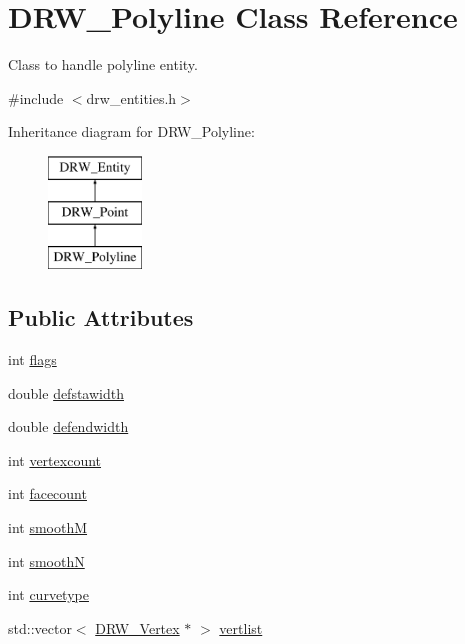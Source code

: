 \hypertarget{class_d_r_w___polyline}{}\section{D\+R\+W\+\_\+\+Polyline Class Reference}
\label{class_d_r_w___polyline}


Class to handle polyline entity.  




{\ttfamily \#include $<$drw\+\_\+entities.\+h$>$}

Inheritance diagram for D\+R\+W\+\_\+\+Polyline\+:\begin{figure}[H]
\begin{center}
\leavevmode
\includegraphics[height=3.000000cm]{d2/dc3/class_d_r_w___polyline}
\end{center}
\end{figure}
\subsection*{Public Attributes}
\begin{DoxyCompactItemize}
\item 
int \hyperlink{class_d_r_w___polyline_a328f232ca859ae9f5561e78457833099}{flags}
\item 
double \hyperlink{class_d_r_w___polyline_a47b35f26221533fdd0d7ef2d91925ca3}{defstawidth}
\item 
double \hyperlink{class_d_r_w___polyline_a8818ce849a6704cb7d83ba7792f3db50}{defendwidth}
\item 
int \hyperlink{class_d_r_w___polyline_ac4bec6f33dd2f8967548d7163525537e}{vertexcount}
\item 
int \hyperlink{class_d_r_w___polyline_ae7e68c83478c4dad5550cfc44fa524bd}{facecount}
\item 
int \hyperlink{class_d_r_w___polyline_aa244ad2243bc7312e01b39876da95edb}{smooth\+M}
\item 
int \hyperlink{class_d_r_w___polyline_a35895911a129d179e1197efa9ca0ec34}{smooth\+N}
\item 
int \hyperlink{class_d_r_w___polyline_a9cd44431960f6b199c218da6ca475fdb}{curvetype}
\item 
std\+::vector$<$ \hyperlink{class_d_r_w___vertex}{D\+R\+W\+\_\+\+Vertex} $\ast$ $>$ \hyperlink{class_d_r_w___polyline_ab001a6b7d6fec6298f52cc1f47df6c87}{vertlist}
\end{DoxyCompactItemize}
